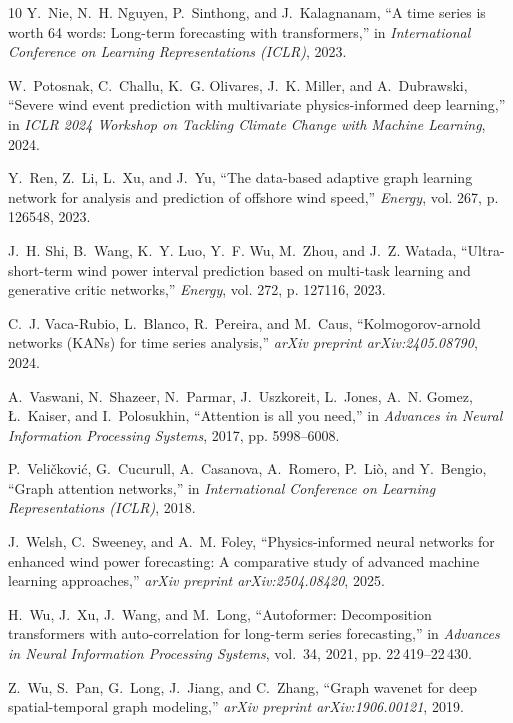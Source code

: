 \documentclass[lettersize,journal]{IEEEtran}
\begin{document}
\begin{thebibliography}{10}
Y.~Nie, N.~H. Nguyen, P.~Sinthong, and J.~Kalagnanam, ``A time series is worth 64 words: Long-term forecasting with transformers,'' in \emph{International Conference on Learning Representations (ICLR)}, 2023.

W.~Potosnak, C.~Challu, K.~G. Olivares, J.~K. Miller, and A.~Dubrawski, ``Severe wind event prediction with multivariate physics-informed deep learning,'' in \emph{ICLR 2024 Workshop on Tackling Climate Change with Machine Learning}, 2024.

Y.~Ren, Z.~Li, L.~Xu, and J.~Yu, ``The data-based adaptive graph learning network for analysis and prediction of offshore wind speed,'' \emph{Energy}, vol. 267, p. 126548, 2023.

J.~H. Shi, B.~Wang, K.~Y. Luo, Y.~F. Wu, M.~Zhou, and J.~Z. Watada, ``Ultra-short-term wind power interval prediction based on multi-task learning and generative critic networks,'' \emph{Energy}, vol. 272, p. 127116, 2023.

C.~J. Vaca-Rubio, L.~Blanco, R.~Pereira, and M.~Caus, ``Kolmogorov-arnold networks ({KANs}) for time series analysis,'' \emph{arXiv preprint arXiv:2405.08790}, 2024.

A.~Vaswani, N.~Shazeer, N.~Parmar, J.~Uszkoreit, L.~Jones, A.~N. Gomez, {\L}.~Kaiser, and I.~Polosukhin, ``Attention is all you need,'' in \emph{Advances in Neural Information Processing Systems}, 2017, pp. 5998--6008.

P.~Veli{\v{c}}kovi{\'{c}}, G.~Cucurull, A.~Casanova, A.~Romero, P.~Li{\`{o}}, and Y.~Bengio, ``Graph attention networks,'' in \emph{International Conference on Learning Representations (ICLR)}, 2018.

J.~Welsh, C.~Sweeney, and A.~M. Foley, ``Physics-informed neural networks for enhanced wind power forecasting: A comparative study of advanced machine learning approaches,'' \emph{arXiv preprint arXiv:2504.08420}, 2025.

H.~Wu, J.~Xu, J.~Wang, and M.~Long, ``{Autoformer}: Decomposition transformers with auto-correlation for long-term series forecasting,'' in \emph{Advances in Neural Information Processing Systems}, vol.~34, 2021, pp. 22\,419--22\,430.

Z.~Wu, S.~Pan, G.~Long, J.~Jiang, and C.~Zhang, ``Graph wavenet for deep spatial-temporal graph modeling,'' \emph{arXiv preprint arXiv:1906.00121}, 2019.


\end{thebibliography}
\end{document}
